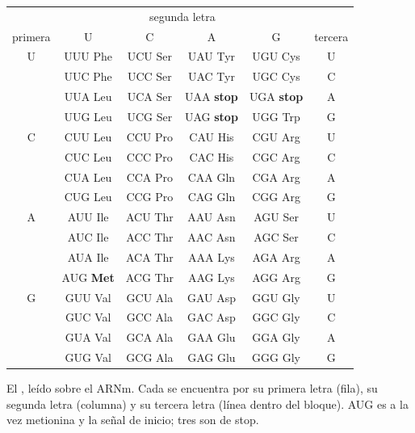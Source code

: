 \begin{omfigure}
\begin{tabular}{c|cccc|c}
\multicolumn{1}{c}{} & \multicolumn{4}{c}{\small segunda letra} & \multicolumn{1}{c}{} \\
{\small primera} & U & C & A & G & {\small tercera} \\ \hline
U & UUU Phe & UCU Ser & UAU Tyr & UGU Cys & U \\
 & UUC Phe & UCC Ser & UAC Tyr & UGC Cys & C \\
 & UUA Leu & UCA Ser & UAA \textbf{stop} & UGA \textbf{stop} & A \\
 & UUG Leu & UCG Ser & UAG \textbf{stop} & UGG Trp & G \\ \hline
C & CUU Leu & CCU Pro & CAU His & CGU Arg & U \\
 & CUC Leu & CCC Pro & CAC His & CGC Arg & C \\
 & CUA Leu & CCA Pro & CAA Gln & CGA Arg & A \\
 & CUG Leu & CCG Pro & CAG Gln & CGG Arg & G \\ \hline
A & AUU Ile & ACU Thr & AAU Asn & AGU Ser & U \\
 & AUC Ile & ACC Thr & AAC Asn & AGC Ser & C \\
 & AUA Ile & ACA Thr & AAA Lys & AGA Arg & A \\
 & AUG \textbf{Met} & ACG Thr & AAG Lys & AGG Arg & G \\ \hline
G & GUU Val & GCU Ala & GAU Asp & GGU Gly & U \\
 & GUC Val & GCC Ala & GAC Asp & GGC Gly & C \\
 & GUA Val & GCA Ala & GAA Glu & GGA Gly & A \\
 & GUG Val & GCG Ala & GAG Glu & GGG Gly & G \\
\end{tabular}

{\small El , leído sobre el ARNm. Cada  se
encuentra por su primera letra (fila), su segunda letra (columna) y su
tercera letra (línea dentro del bloque). AUG es a la vez metionina y la
señal de inicio; tres  son de stop.}
\end{omfigure}

